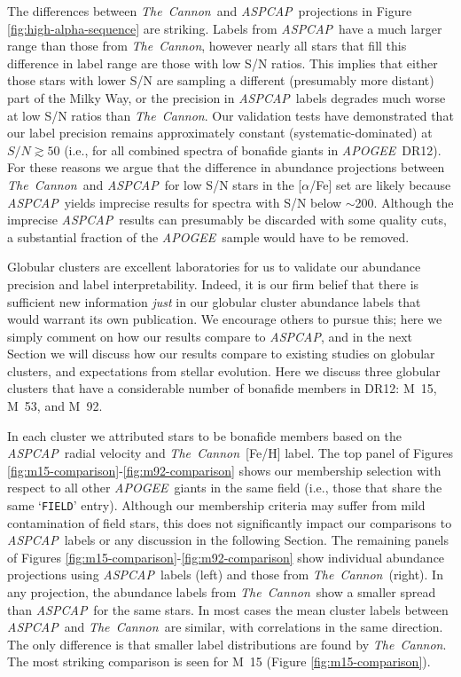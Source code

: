 \documentclass[12pt,preprint]{aastex6}
\newcommand{\project}[1]{\textsl{#1}}
\newcommand{\TheCannon}{\project{The~Cannon}}
\newcommand{\acronym}[1]{{\small{#1}}}
\newcommand{\apogee}{\project{\acronym{APOGEE}}}
\newcommand{\aspcap}{\project{\acronym{ASPCAP}}}
\newcommand{\dr}{\acronym{DR12}}
\begin{document}
The differences between \TheCannon\ and \aspcap\ projections in Figure \ref{fig:high-alpha-sequence} are striking.  Labels
from \aspcap\ have a much larger range than those from \TheCannon,
however nearly all stars that fill this difference in label range are those
with low S/N ratios.  This implies that either those stars with lower S/N
are sampling a different (presumably more distant) part of the Milky Way,
or the precision in \aspcap\ labels degrades much worse at low S/N ratios than \TheCannon.
Our validation tests have demonstrated that our label precision remains
approximately constant (systematic-dominated) at $S/N \gtrsim 50$ (i.e.,
for all combined spectra of bonafide giants in \apogee\ \dr).  For these reasons we argue
that the difference in abundance projections between \TheCannon\ and
\aspcap\ for low S/N stars in the [$\alpha$/Fe] set are likely because \aspcap\
yields imprecise results for spectra with S/N below $\sim$200.  Although
the imprecise \aspcap\ results can presumably be discarded with some 
quality cuts, a substantial fraction of the \apogee\ sample would have
to be removed.


Globular clusters are excellent laboratories for us to validate
our abundance precision and label interpretability.  Indeed, it is our
firm belief that there is sufficient new information \emph{just} in our
globular cluster abundance labels that would warrant its own publication.
We encourage others to pursue this; here we simply comment on how our results 
compare to \aspcap, and in the next Section we will discuss how our
results compare to existing studies on globular clusters, and 
expectations from stellar evolution.  Here we discuss three globular
clusters that have a considerable number of bonafide members in \dr:
M~15, M~53, and M~92.  


In each cluster we attributed stars to be bonafide members based on the
\aspcap\ radial velocity and \TheCannon\ [Fe/H] label.  The top panel of
Figures \ref{fig:m15-comparison}-\ref{fig:m92-comparison} shows our 
membership selection with respect to all other \apogee\ giants in the
same field (i.e., those that share the same `\texttt{FIELD}' entry).
Although our membership criteria may suffer from mild contamination of
field stars, this does not significantly impact our comparisons to 
\aspcap\ labels or any discussion in the following Section.  The 
remaining panels of Figures \ref{fig:m15-comparison}-\ref{fig:m92-comparison} show individual abundance projections
using \aspcap\ labels (left) and those from \TheCannon\ (right). 
In any projection, the abundance labels from \TheCannon\ show a smaller
spread than \aspcap\ for the same stars.  In most cases the mean cluster
labels between \aspcap\ and \TheCannon\ are similar, with correlations
in the same direction. The only difference is that smaller label
distributions are found by \TheCannon.  The most striking comparison 
is seen for M~15 (Figure \ref{fig:m15-comparison}).
\end{document}
